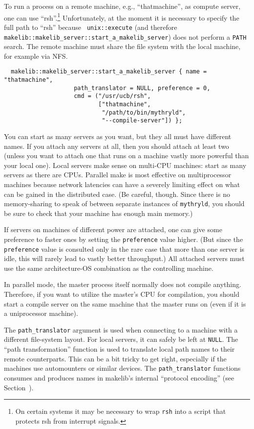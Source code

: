To run a process on a remote machine, e.g., ``thatmachine'', as
compute server, one can use ``rsh''.\footnote{On certain systems it
may be necessary to wrap {\tt rsh} into a script that protects rsh
from interrupt signals.}  Unfortunately, at the moment it
is necessary to specify the full path to ``rsh'' because {\tt
unix::execute} (and therefore {\tt makelib::makelib_server::start_a_makelib_server})
does not perform a {\tt PATH} search. The remote machine
must share the file system with the local machine, for example via NFS.

\begin{verbatim}
  makelib::makelib_server::start_a_makelib_server { name = "thatmachine",
                    path_translator = NULL, preference = 0,
                    cmd = ("/usr/ucb/rsh",
                           ["thatmachine",
                            "/path/to/bin/mythryld",
                            "--compile-server"]) };
\end{verbatim}

You can start as many servers as you want, but they all must have
different names.  If you attach any servers at all, then you should
attach at least two (unless you want to attach one that runs on a
machine vastly more powerful than your local one).  Local servers make
sense on multi-CPU machines: start as many servers as there are CPUs.
Parallel make is most effective on multiprocessor machines because
network latencies can have a severely limiting effect on what can be
gained in the distributed case.
(Be careful, though.  Since there is no memory-sharing to speak of
between separate instances of {\tt mythryld}, you should be sure to check
that your machine has enough main memory.)

If servers on machines of different power are attached, one can give
some preference to faster ones by setting the {\tt preference} value higher.
(But since the {\tt preference} value is consulted only in the rare case
that more than one server is idle, this will rarely lead to vastly
better throughput.) All attached servers must use the same
architecture-OS combination as the controlling machine.

In parallel mode, the master process itself normally does not compile
anything.  Therefore, if you want to utilize the master's CPU for
compilation, you should start a compile server on the same machine
that the master runs on (even if it is a uniprocessor machine).

The {\tt path_translator} argument is used when connecting to a machine with
a different file-system layout.  For local servers, it can safely be
left at {\tt NULL}.  The ``path transformation'' function is used to
translate local path names to their remote counterparts.  This can be
a bit tricky to get right, especially if the machines use automounters
or similar devices.  The {\tt path_translator} functions consumes and
produces names in makelib's internal ``protocol encoding'' (see
Section~).

